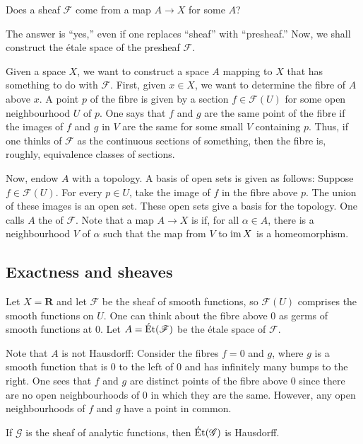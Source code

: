 \documentclass [11 pt, oneside, margin = 1 in] {article}
\begin{document}
\begin{problem}
	Does a sheaf $\mathscr{F}$ come from a map $A\longrightarrow X$ for some $A$?
\end{problem}

The answer is ``yes,'' even if one replaces ``sheaf'' with ``presheaf.'' Now, we shall construct the \'etale space of the presheaf $\mathscr{F}$. 

Given a space $X$, we want to construct a space $A$ mapping to $X$ that has something to do with $\mathscr{F}$. First, given $x\in X$, we want to determine the fibre of $A$ above $x$. A point $p$ of the fibre is given by a section $f\in \mathscr{F}(U)$ for some open neighbourhood $U$ of $p$. One says that $f$ and $g$ are the same point of the fibre if the images of $f$ and $g$ in $V$ are the same for some small $V$ containing $p$. Thus, if one thinks of $\mathscr{F}$ as the continuous sections of something, then the fibre is, roughly, equivalence classes of sections.

Now, endow $A$ with a topology. A basis of open sets is given as follows: Suppose $f\in \mathscr{F}(U)$. For every $p\in U$, take the image of $f$ in the fibre above $p$. The union of these images is an open set. These open sets give a basis for the topology. One calls $A$ the  of $\mathscr{F}$. Note that a map $A\longrightarrow X$ is  if, for all $\alpha\in A$, there is a neighbourhood $V$ of $\alpha$ such that the map from $V$ to $\operatorname{im} X$ is a homeomorphism.

\subsection{Exactness and sheaves}
\begin{example}[ ]\label{}\text{}
Let $X=\mathbf{R}$ and let $\mathscr{F}$ be the sheaf of smooth functions, so $\mathscr{F}(U)$ comprises the smooth functions on $U$. One can think about the fibre above $0$ as germs of smooth functions at $0$. Let $A = \operatorname{\acute Et} ( \mathscr{F})$ be the \'etale space of $\mathscr{F}$. 

Note that $A$ is not Hausdorff: Consider the fibres $f=0$ and $g$, where $g$ is a smooth function that is $0$ to the left of $0$ and has infinitely many bumps to the right. 
One sees that $f$ and $g$ are distinct points of the fibre above $0$ since there are no open neighbourhoods of $0$ in which they are the same. However, any open neighbourhoods of $f$ and $g$ have a point in common.

If $\mathscr{G}$ is the sheaf of analytic functions, then $\operatorname{\acute Et}(\mathscr{G})$ is Hausdorff.
\end{example}
\end{document}
